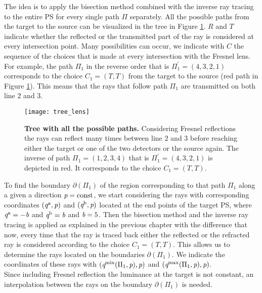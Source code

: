 The idea is to apply the bisection method combined with the inverse ray tracing to the entire PS for every single path $\Pi$ separately. All the possible paths from the target to the source can be visualized in the tree in Figure \ref{fig:tree_fresnel}. $R$ and $T$ indicate whether the reflected or the transmitted part of the ray is considered at every intersection point. Many possibilities can occur, we indicate with $C$ the sequence of the choices that is made at every intersection with the Fresnel lens. For example, the path $\Pi_1$ in the reverse order that is 
$\Pi_1^{\prime}=(4,3,2,1)$ corresponds to the choice $C_1= (T,T)$ from the target to the source (red path in Figure \ref{fig:tree_fresnel}). This means that the rays that follow path $\Pi_1$ are transmitted on both line $2$ and $3$. 
\begin{figure}[t]
  \begin{center}
  \texttt{[image: tree\_lens]}
  \end{center}
  \caption{\textbf{Tree with all the possible paths.} Considering Fresnel reflections the rays can reflect many times between line $2$ and $3$ before reaching either the target or one of the two detectors or the source again. The inverse of path $\Pi_1 = (1,2,3,4)$ that is $\Pi_1^{\prime} = (4,3,2,1)$ is depicted in red. It corresponds to the choice $C_1= (T,T)$.}
\label{fig:tree_fresnel}
 \end{figure}
To find the boundary $\partial$$(\Pi_1)$ of the region corresponding to that path $\Pi_1$ along a given a direction $\textit{p} = \textrm{const}$, we start considering the rays with corresponding coordinates $(\textit{q}^{\textrm{a}}, \textit{p})$ and $(\textit{q}^{\textrm{b}}, \textit{p})$ located at the end points of the target PS, where $\textit{q}^{\textrm{a}} = -\textit{b}$ and $\textit{q}^{\textrm{b}} = \textit{b}$ and $\textit{b}=5$. Then the bisection method and the inverse ray tracing is applied as explained in the previous chapter with the difference that now, every time that the ray is traced back either the reflected or the refracted ray is considered according to the choice $C_1= (T,T)$. This allows us to determine the rays located on the boundaries $\partial$$(\Pi_1)$. We indicate the coordinates of these rays with $(\textit{q}^{\textrm{min}}(\Pi_1, \textit{p}), \textit{p})$ and $(\textit{q}^{\textrm{max}}(\Pi_1, \textit{p}), \textit{p})$. \\ \indent
Since including Fresnel reflection the luminance at the target is not constant, an interpolation between the rays on the boundary $\partial$$(\Pi_1)$ is needed. 
